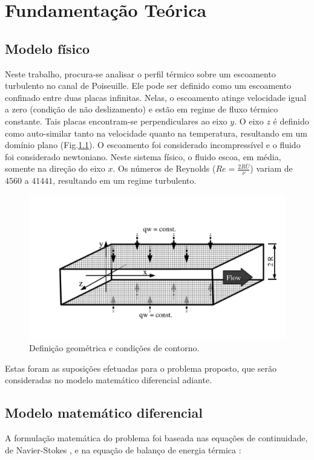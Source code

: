 \chapter[Fundamentação Teórica]{Fundamentação Teórica}


\section{Modelo físico}

Neste trabalho, procura-se analisar o perfil térmico sobre um escoamento turbulento no canal de Poiseuille. Ele pode ser definido como um escoamento confinado entre duas placas infinitas. Nelas, o escoamento atinge velocidade igual a zero (condição de não deslizamento) e estão em regime de fluxo térmico constante. Tais placas encontram-se perpendiculares ao eixo $y$. O eixo $z$ é definido como auto-similar tanto na velocidade quanto na temperatura, resultando em um domínio plano (Fig.\ref{descricaoGeometrica}). O escoamento foi considerado incompressível e o fluido foi considerado newtoniano. Neste sistema físico, o fluido escoa, em média, somente na direção do eixo $x$.
Os números de Reynolds ($Re = \frac{2R \overline{U}}{\nu}$) variam de $4560$ a $41441$, resultando em um regime turbulento.

\begin{figure}[h!]
	\centering
	\includegraphics[angle=0, trim={0mm 23mm 0mm 35mm}, clip , scale=0.42]{cap_fundamentacao/canal1.pdf}
	\caption{Definição geométrica e condições de contorno.}
	\label{descricaoGeometrica}
\end{figure}

Estas foram as suposições efetuadas para o problema proposto, que serão consideradas no modelo matemático diferencial adiante.

\section{Modelo matemático diferencial}
A formulação matemática do problema foi baseada nas equações de continuidade, de Navier-Stokes \cite{Cengel}, e na equação de balanço de energia térmica \cite{Incropera}: 

